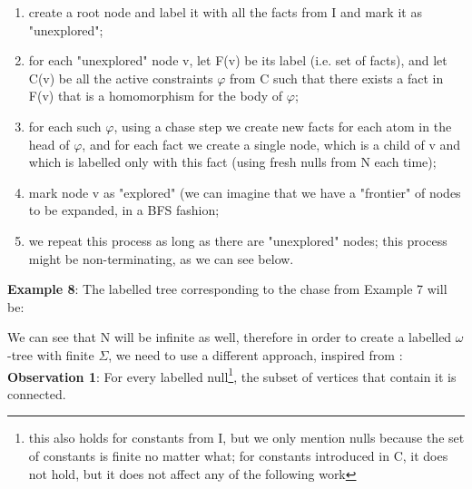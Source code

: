 \documentclass[11pt, a4paper, dvipsnames]{article}
\begin{document}
\begin{enumerate}
	\item create a root node and label it with all the facts from I and mark it as "unexplored";
	\item for each "unexplored" node v, let F(v) be its label (i.e. set of facts), and let C(v) be all the active constraints $\varphi$ from C such that there exists a fact in F(v) that is a homomorphism for the body of $\varphi$;
	\item for each such $\varphi$, using a chase step we create new facts for each atom in the head of $\varphi$, and for each fact we create a single node, which is a child of v and which is labelled only with this fact (using fresh nulls from N each time);
	\item mark node v as "explored" (we can imagine that we have a "frontier" of nodes to be expanded, in a BFS fashion;
	\item we repeat this process as long as there are "unexplored" nodes; this process might be non-terminating, as we can see below.
\end{enumerate}
\textbf{Example 8}: The labelled tree corresponding to the chase from Example 7 will be:\newline
\begin{center}
\end{center}
We can see that N will be infinite as well, therefore in order to create a labelled $\omega$-tree with finite $\Sigma$, we need to use a different approach, inspired from \cite{decidable}: \newline
\textbf{Observation 1}: For every labelled null\footnote{this also holds for constants from I, but we only mention nulls because the set of constants is finite no matter what; for constants introduced in C, it does not hold, but it does not affect any of the following work}, the subset of vertices that contain it is connected. \newline
\end{document}
